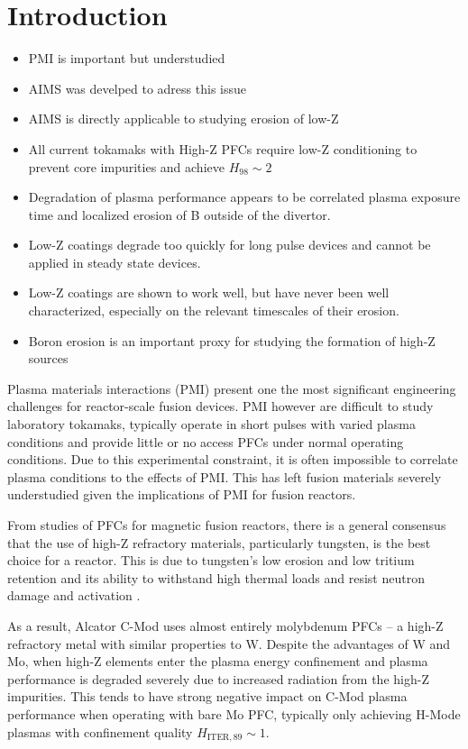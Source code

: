 \documentclass[11pt,a4paper,twocolumn]{article}
\begin{document}
\section{Introduction}
\begin{itemize}
	\item PMI is important but understudied
	\item AIMS was develped to adress this issue
	\item AIMS is directly applicable to studying erosion of low-Z
	\item All current tokamaks with High-Z PFCs require low-Z conditioning to prevent core impurities and achieve $H_{98}\sim 2$
	\item Degradation of plasma performance appears to be correlated plasma exposure time and localized erosion of B outside of the divertor.
	\item Low-Z coatings degrade too quickly for long pulse devices and cannot be applied in steady state devices.
	\item Low-Z coatings are shown to work well, but have never been well characterized, especially on the relevant timescales of their erosion.
	\item Boron erosion is an important proxy for studying the formation of high-Z sources 
\end{itemize}

Plasma materials interactions (PMI) present one the most significant engineering challenges for reactor-scale fusion devices.  PMI however are difficult to study laboratory tokamaks, typically operate in short pulses with varied plasma conditions and provide little or no access PFCs under normal operating conditions.  Due to this experimental constraint, it is often impossible to correlate plasma conditions to the effects of PMI.  This has left fusion materials severely understudied given the implications of PMI for fusion reactors.


From studies of PFCs for magnetic fusion reactors, there is a general consensus that the use of high-Z refractory materials, particularly tungsten, is the best choice for a reactor.  This is due to tungsten's low erosion and low tritium retention and its ability to withstand high thermal loads and resist neutron damage and activation \cite{WWoBoronization}.  

As a result, Alcator C-Mod uses almost entirely molybdenum PFCs -- a high-Z refractory metal with similar properties to W.  Despite the advantages of W and Mo, when high-Z elements enter the plasma energy confinement and plasma performance is degraded severely due to increased radiation from the high-Z impurities.  This tends to have strong negative impact on C-Mod plasma performance when operating with bare Mo PFC, typically only achieving H-Mode plasmas with confinement quality $H_\mathrm{ITER,89} \sim 1$.  
\end{document}
